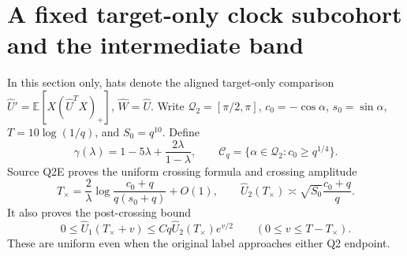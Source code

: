 \documentclass[11pt]{article}
\theoremstyle{remark}\newtheorem{remark}[theorem]{Remark}
\newcommand{\E}{\mathbb E}\newcommand{\dd}{\,d}
\newcommand{\Qtwo}{\mathcal Q_2}\newcommand{\Clk}{\mathcal C_q}
\begin{document}
\section{A fixed target-only clock subcohort and the intermediate band}
In this section only, hats denote the aligned target-only comparison
$\widehat U'=\E[X(\widehat U^TX)_+]$, $\widehat W=\widehat U$.
Write $\Qtwo=[\pi/2,\pi]$, $c_0=-\cos\alpha$, $s_0=\sin\alpha$,
$T=10\log(1/q)$, and $S_0=q^{10}$. Define
\[
 \gamma(\lambda)=1-5\lambda+\frac{2\lambda}{1-\lambda},\qquad
 \Clk=\{\alpha\in\Qtwo:c_0\ge q^{1/4}\}.
\]
Source Q2E proves the uniform crossing formula and crossing amplitude
\begin{equation}\label{inc:AN03:bulkclock:v1:crossinput}
 T_\times=\frac2\lambda\log\frac{c_0+q}{q(s_0+q)}+O(1),\qquad
 \widehat U_2(T_\times)\asymp\sqrt{S_0}\frac{c_0+q}{q}.
\end{equation}
It also proves the post-crossing bound
\begin{equation}\label{inc:AN03:bulkclock:v1:U1input}
 0\le\widehat U_1(T_\times+v)
 \le Cq\widehat U_2(T_\times)e^{v/2}\qquad(0\le v\le T-T_\times).
\end{equation}
These are uniform even when the original label approaches either Q2 endpoint.
\end{document}
